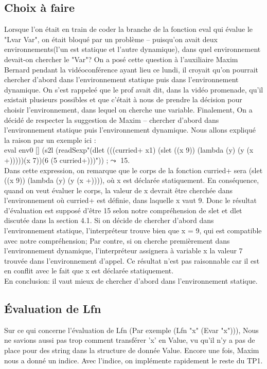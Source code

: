 \documentclass{article}
\begin{document}
\subsection{Choix à faire}
    Lorsque l'on était en train de coder la branche de la fonction eval qui évalue le "Lvar Var", on était bloqué par un problème -- 
    puisqu'on avait deux environnements(l'un est statique et l'autre dynamique), dans quel environnement 
    devait-on chercher le "Var"? On a posé cette question à l'auxiliaire Maxim Bernard pendant la vidéoconférence 
    ayant lieu ce lundi, il croyait qu'on pourrait chercher d'abord dans l'environnement statique puis dans
    l'environnement dynamique. On s'est rappeleé que le prof avait dit, dans la vidéo promenade, qu'il existait 
    plusieurs possibles et que c'était à nous de prendre la décision pour choisir l'environnement, dans lequel 
    on cherche une variable. Finalement, On a décidé de respecter la suggestion de Maxim -- chercher d'abord dans 
    l'environnement statique puis l'environnement dynamique. Nous allons expliqué la raison par
    un exemple ici : \\
    eval env0 [] (s2l (readSexp"(dlet (((curried+ x1) (slet ((x 9)) (lambda (y) (y (x +)))))(x 7))(6 (5 curried+)))"))
    ;$\leadsto$ 15.\\
    Dans cette expression, on remarque que le corps de la fonction curried+ sera (slet ((x 9)) (lambda (y) (y (x +)))),
    où x est déclarée statiquement. En conséquence, quand on veut évaluer le corps, la valeur
    de x devrait être cherchée dans l'environnement où curried+ est définie, dans laquelle x vaut 9. Donc le résultat d'évaluation
    est supposé d'être 15 selon notre compréhension de slet et dlet discutée dans la section 4.1.
    Si on décide de chercher d'abord dans l'environnement statique, l'interpréteur trouve bien que
    x = 9, qui est compatible avec notre compréhension; Par contre, si on cherche premièrement dans l'environnement dynamique,
    l'interpréteur assignera à variable x la valeur 7 trouvée dans l'environnement d'appel. Ce résultat n'est pas
    raisonnable car il est en conflit avec le fait que x est déclarée statiquement. \\
    En conclusion: il vaut mieux de chercher d'abord dans l'environnement statique.

\subsection{Évaluation de Lfn}
 Sur ce qui concerne l'évaluation de Lfn (Par exemple (Lfn "x" (Evar "x"))), Nous ne savions aussi pas trop comment transférer 'x' en Value, 
 vu qu'il n'y a pas de place pour des string dans la structure de donnée Value. Encore une fois, Maxim nous a donné un indice. 
 Avec l'indice, on implémente rapidement le reste du TP1.
\end{document}
